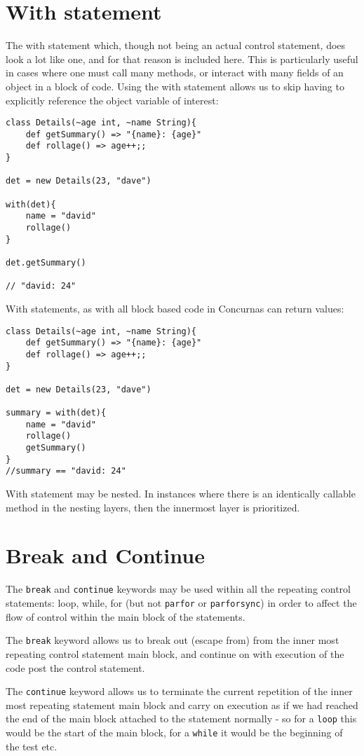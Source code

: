 \documentclass[conc-doc]{subfiles}
\begin{document}
\section{With statement}
The with statement which, though not being an actual control statement, does look a lot like one, and for that reason is included here. This is particularly useful in cases where one must call many methods, or interact with many fields of an object  in a block of code. Using the with statement allows us to skip having to explicitly reference the object variable of interest:
\begin{lstlisting}
class Details(~age int, ~name String){
	def getSummary() => "{name}: {age}"
	def rollage() => age++;;
}

det = new Details(23, "dave")

with(det){
	name = "david"
	rollage()
}

det.getSummary()

// "david: 24"
\end{lstlisting}

With statements, as with all block based code in Concurnas can return values:

\begin{lstlisting}
class Details(~age int, ~name String){
	def getSummary() => "{name}: {age}"
	def rollage() => age++;;
}

det = new Details(23, "dave")

summary = with(det){
	name = "david"
	rollage()
	getSummary()
}
//summary == "david: 24"
\end{lstlisting}

With statement may be nested. In instances where there is an identically callable method in the nesting layers, then the innermost layer is prioritized. 

\section{Break and Continue}
The \lstinline{break} and \lstinline{continue} keywords may be used within all the repeating control statements: loop, while, for (but not \lstinline{parfor} or \lstinline{parforsync}) in order to affect the flow of control within the main block of the statements.

The \lstinline{break} keyword allows us to break out (escape from) from the inner most repeating control statement main block, and continue on with execution of the code post the control statement.

The \lstinline{continue} keyword allows us to terminate the current repetition of the inner most repeating statement main block and carry on execution as if we had reached the end of the main block attached to the statement normally - so for a \lstinline{loop} this would be the start of the main block, for a \lstinline{while} it would be the beginning of the test etc.
\end{document}
